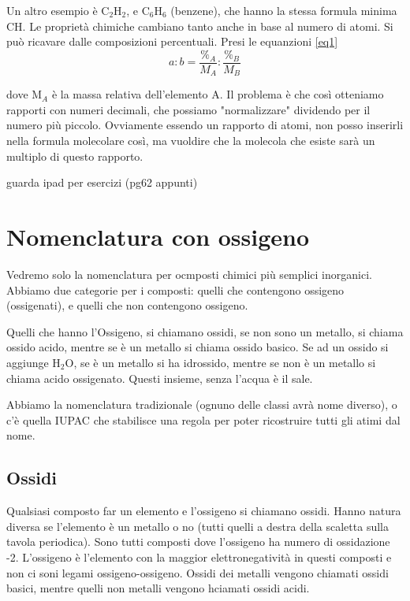 \documentclass[a4paper]{article}
\begin{document}
Un altro esempio è C$_2$H$_2$, e C$_6$H$_6$ (benzene), che hanno la stessa formula minima CH. Le proprietà chimiche cambiano tanto anche in base al numero di atomi. Si può ricavare dalle composizioni percentuali. Presi le equanzioni \ref{eq1}
\begin{equation*}
    a:b = \frac{\%_A}{M_A}:\frac{\%_B}{M_B}
\end{equation*}

dove M$_A$ è la massa relativa dell'elemento A. Il problema è che così otteniamo rapporti con numeri decimali, che possiamo "normalizzare" dividendo per il numero più piccolo. Ovviamente essendo un rapporto di atomi, non posso inserirli nella formula molecolare così, ma vuoldire che la molecola che esiste sarà un multiplo di questo rapporto. 


guarda ipad per esercizi (pg62 appunti)

\section{Nomenclatura con ossigeno}
Vedremo solo la nomenclatura per ocmposti chimici più semplici inorganici. Abbiamo due categorie per i composti: quelli che contengono ossigeno (ossigenati), e quelli che non contengono ossigeno. 

Quelli che hanno l'Ossigeno, si chiamano ossidi, se non sono un metallo, si chiama ossido acido, mentre se è un metallo si chiama ossido basico. 
Se ad un ossido si aggiunge H$_2$O, se è un metallo si ha idrossido, mentre se non è un metallo si chiama acido ossigenato. Questi insieme, senza l'acqua è il sale. 

Abbiamo la nomenclatura tradizionale (ognuno delle classi avrà nome diverso), o c'è quella IUPAC che stabilisce una regola per poter ricostruire tutti gli atimi dal nome.

\subsection{Ossidi}
Qualsiasi composto far un elemento e l'ossigeno si chiamano ossidi. Hanno natura diversa se l'elemento è un metallo o no (tutti quelli a destra della scaletta sulla tavola periodica). Sono tutti composti dove l'ossigeno ha numero di ossidazione -2. L'ossigeno è l'elemento con la maggior elettronegatività in questi composti e non ci soni legami ossigeno-ossigeno. Ossidi dei metalli vengono chiamati ossidi basici, mentre quelli non metalli vengono hciamati ossidi acidi. 
\end{document}
